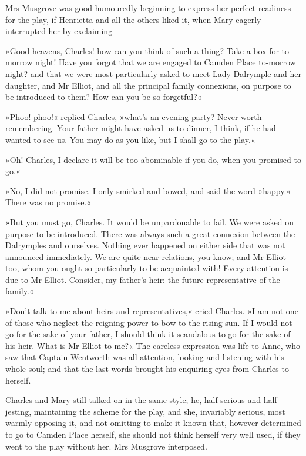 Mrs Musgrove was good humouredly beginning to express her perfect readiness for the play, if Henrietta and all the others liked it, when Mary eagerly interrupted her by exclaiming—

»Good heavens, Charles! how can you think of such a thing? Take a box for to-morrow night! Have you forgot that we are engaged to Camden Place to-morrow night? and that we were most particularly asked to meet Lady Dalrymple and her daughter, and Mr Elliot, and all the principal family connexions, on purpose to be introduced to them? How can you be so forgetful?«

»Phoo! phoo!« replied Charles, »what's an evening party? Never worth remembering. Your father might have asked us to dinner, I think, if he had wanted to see us. You may do as you like, but I shall go to the play.«

»Oh! Charles, I declare it will be too abominable if you do, when you promised to go.«

»No, I did not promise. I only smirked and bowed, and said the word »happy.« There was no promise.«

»But you must go, Charles. It would be unpardonable to fail. We were asked on purpose to be introduced. There was always such a great connexion between the Dalrymples and ourselves. Nothing ever happened on either side that was not announced immediately. We are quite near relations, you know; and Mr Elliot too, whom you ought so particularly to be acquainted with! Every attention is due to Mr Elliot. Consider, my father's heir: the future representative of the family.«

»Don't talk to me about heirs and representatives,« cried Charles. »I am not one of those who neglect the reigning power to bow to the rising sun. If I would not go for the sake of your father, I should think it scandalous to go for the sake of his heir. What is Mr Elliot to me?« The careless expression was life to Anne, who saw that Captain Wentworth was all attention, looking and listening with his whole soul; and that the last words brought his enquiring eyes from Charles to herself.

Charles and Mary still talked on in the same style; he, half serious and half jesting, maintaining the scheme for the play, and she, invariably serious, most warmly opposing it, and not omitting to make it known that, however determined to go to Camden Place herself, she should not think herself very well used, if they went to the play without her. Mrs Musgrove interposed.

